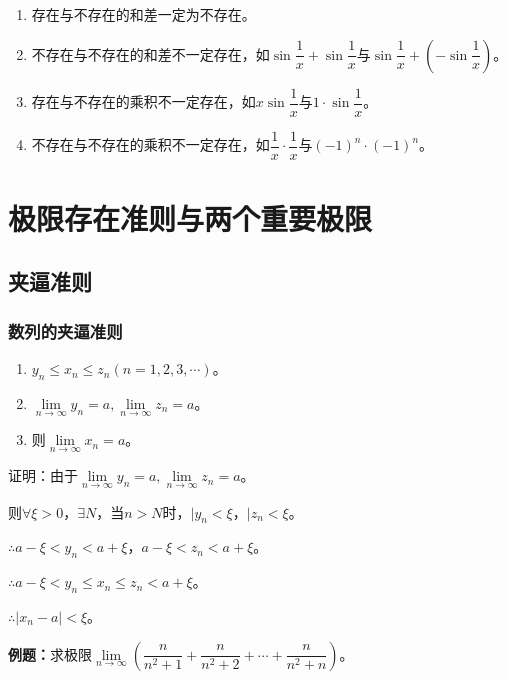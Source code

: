 \documentclass[UTF8, 12pt]{ctexart}
\begin{document}
        \begin{enumerate}
            \item 存在与不存在的和差一定为不存在。
            \item 不存在与不存在的和差不一定存在，如$\sin\dfrac{1}{x}+\sin\dfrac{1}{x}$与$\sin\dfrac{1}{x}+\left(-\sin\dfrac{1}{x}\right)$。
            \item 存在与不存在的乘积不一定存在，如$x\sin\dfrac{1}{x}$与$1\cdot\sin\dfrac{1}{x}$。
            \item 不存在与不存在的乘积不一定存在，如$\dfrac{1}{x}\cdot\dfrac{1}{x}$与$(-1)^n\cdot(-1)^n$。
        \end{enumerate}

        \section{极限存在准则与两个重要极限}

        \subsection{夹逼准则}

        \subsubsection{数列的夹逼准则}

        \begin{enumerate}
            \item $y_n\leqslant x_n\leqslant z_n(n=1,2,3,\cdots)$。
            \item $\lim\limits_{n\to\infty}y_n=a,\lim\limits_{n\to\infty}z_n=a$。
            \item 则$\lim\limits_{n\to\infty}x_n=a$。
        \end{enumerate}

        证明：由于$\lim\limits_{n\to\infty}y_n=a,\lim\limits_{n\to\infty}z_n=a$。

        则$\forall\xi>0$，$\exists N$，当$n>N$时，$\vert y_n<\xi$，$\vert z_n<\xi$。

        $\therefore a-\xi<y_n<a+\xi$，$a-\xi<z_n<a+\xi$。

        $\therefore a-\xi<y_n\leqslant x_n\leqslant z_n<a+\xi$。

        $\therefore\vert x_n-a\vert<\xi$。

        \textbf{例题：}求极限$\lim\limits_{n\to\infty}\left(\dfrac{n}{n^2+1}+\dfrac{n}{n^2+2}+\cdots+\dfrac{n}{n^2+n}\right)$。
\end{document}
